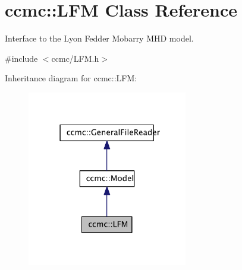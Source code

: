 \hypertarget{classccmc_1_1_l_f_m}{\section{ccmc\-:\-:L\-F\-M Class Reference}
\label{classccmc_1_1_l_f_m}
}


Interface to the Lyon Fedder Mobarry M\-H\-D model.  




{\ttfamily \#include $<$ccmc/\-L\-F\-M.\-h$>$}



Inheritance diagram for ccmc\-:\-:L\-F\-M\-:\nopagebreak
\begin{figure}[H]
\begin{center}
\leavevmode
\includegraphics[width=198pt]{classccmc_1_1_l_f_m__inherit__graph}
\end{center}
\end{figure}



